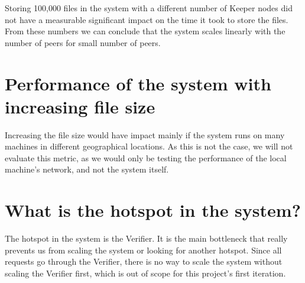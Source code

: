\documentclass[ twoside,openright,titlepage,numbers=noenddot,headinclude,%
                footinclude=true,cleardoublepage=empty,abstractoff, %
                BCOR=5mm,paper=a4,fontsize=11pt,%
                ngerman,american,%
                ]{scrreprt}
\begin{document}
Storing 100,000 files in the system with a different number of Keeper nodes did not have a measurable significant
impact on the time it took to store the files.
From these numbers we can conclude that the system scales linearly with the number of peers for small number of peers.

\section{Performance of the system with increasing file size}

Increasing the file size would have impact mainly if
the system runs on many machines in different geographical locations.
As this is not the case, we will not evaluate this metric,
as we would only be testing the performance of the local machine's network, and not the system itself.

\section{What is the hotspot in the system?}

The hotspot in the system is the Verifier.
It is the main bottleneck that really prevents us from scaling the system or looking for another hotspot.
Since all requests go through the Verifier, there is no way to scale the system without scaling the Verifier first,
which is out of scope for this project's first iteration.


\printbibliography
\end{document}
